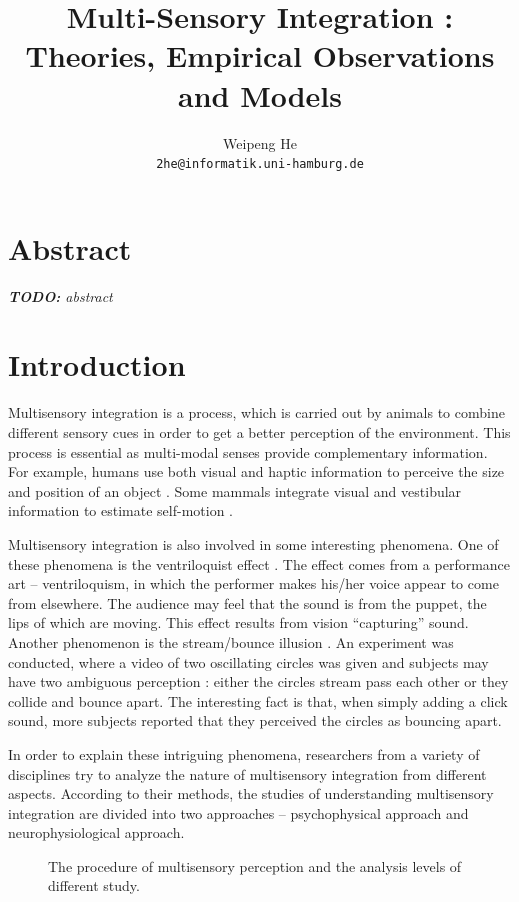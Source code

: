 \documentclass{article}[11pt]
\title{Multi-Sensory Integration : Theories, Empirical Observations and Models}
\author{Weipeng He \\ \texttt{2he@informatik.uni-hamburg.de}}
\newcommand{\inputTikZ}[1]{%
}
\newcommand{\TODO}[1]{\emph{\small{{\bf TODO: } #1}}}
\begin{document}
\maketitle

\section*{Abstract}
\TODO{abstract}


\section{Introduction}
\label{sec:intro}

Multisensory integration is a process, which is carried out by animals to combine different sensory cues in order to get a better perception of the environment. This process is essential as multi-modal senses provide complementary information.
For example, humans use both visual and haptic information to perceive the size and position of an object \cite{ernst_humans_2002}. Some mammals integrate visual and vestibular information to estimate self-motion \cite{gu_visual_2006}.

Multisensory integration is also involved in some interesting phenomena. One of these phenomena is the ventriloquist effect \cite{alais_ventriloquist_2004}. The effect comes from a performance art -- ventriloquism, in which the performer makes his/her voice appear to come from elsewhere. The audience may feel that the sound is from the puppet, the lips of which are moving. This effect results from vision ``capturing'' sound.
Another phenomenon is the stream/bounce illusion \cite{sekuler_sound_1997}. An experiment was conducted, where a video of two oscillating circles was given and subjects may have two ambiguous perception : either the circles stream pass each other or they collide and bounce apart. The interesting fact is that, when simply adding a click sound, more subjects reported that they perceived the circles as bouncing apart.

In order to explain these intriguing phenomena, researchers from a variety of disciplines try to analyze the nature of multisensory integration from different aspects. According to their methods, the studies of understanding multisensory integration are divided into two approaches -- psychophysical approach and neurophysiological approach.

\begin{figure}[tpbh]
  \centering \inputTikZ{flow}
  \caption{The procedure of multisensory perception and the analysis levels of different study.}
  \label{fig:flow}
\end{figure}
\end{document}
